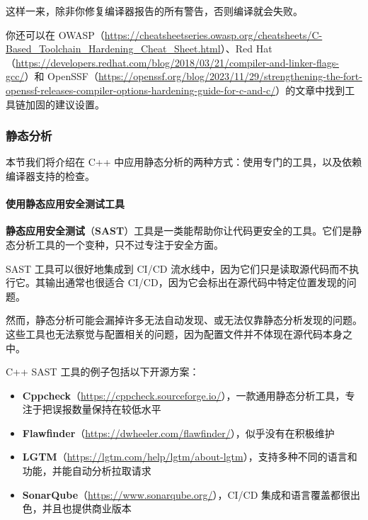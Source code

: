 这样一来，除非你修复编译器报告的所有警告，否则编译就会失败。

\label{idx:1072}
\label{idx:1073}
你还可以在 OWASP（\href{https://cheatsheetseries.owasp.org/cheatsheets/C-Based_Toolchain_Hardening_Cheat_Sheet.html}{https://cheatsheetseries.owasp.org/cheatsheets/C-Based\_Toolchain\_Hardening\_Cheat\_Sheet.html}）、Red Hat（\href{https://developers.redhat.com/blog/2018/03/21/compiler-and-linker-flags-gcc}{https://developers.redhat.com/blog/2018/03/21/compiler-and-linker-flags-gcc/}）和 OpenSSF（\href{https://openssf.org/blog/2023/11/29/strengthening-the-fort-openssf-releases-compiler-options-hardening-guide-for-c-and-c/}{https://openssf.org/blog/2023/11/29/strengthening-the-fort-openssf-releases-compiler-options-hardening-guide-for-c-and-c/}）的文章中找到工具链加固的建议设置。

\subsubsection{静态分析}

\label{idx:1074}
本节我们将介绍在 C++ 中应用静态分析的两种方式：使用专门的工具，以及依赖编译器支持的检查。

\paragraph{使用静态应用安全测试工具}

\label{idx:1075}
\label{idx:1076}
\textbf{静态应用安全测试}（\textbf{SAST}）工具是一类能帮助你让代码更安全的工具。它们是静态分析工具的一个变种，只不过专注于安全方面。

SAST 工具可以很好地集成到 CI/CD 流水线中，因为它们只是读取源代码而不执行它。其输出通常也很适合 CI/CD，因为它会标出在源代码中特定位置发现的问题。

然而，静态分析可能会漏掉许多无法自动发现、或无法仅靠静态分析发现的问题。这些工具也无法察觉与配置相关的问题，因为配置文件并不体现在源代码本身之中。

C++ SAST 工具的例子包括以下开源方案：

\begin{itemize}
\label{idx:1077}
\item \textbf{Cppcheck}（\href{https://cppcheck.sourceforge.io/}{https://cppcheck.sourceforge.io/}），一款通用静态分析工具，专注于把误报数量保持在较低水平
\label{idx:1078}
\item \textbf{Flawfinder}（\href{https://dwheeler.com/flawfinder/}{https://dwheeler.com/flawfinder/}），似乎没有在积极维护
\label{idx:1079}
\item \textbf{LGTM}（\href{https://lgtm.com/help/lgtm/about-lgtm}{https://lgtm.com/help/lgtm/about-lgtm}），支持多种不同的语言和功能，并能自动分析拉取请求
\label{idx:1080}
\item \textbf{SonarQube}（\href{https://www.sonarqube.org/}{https://www.sonarqube.org/}），CI/CD 集成和语言覆盖都很出色，并且也提供商业版本
\end{itemize}

